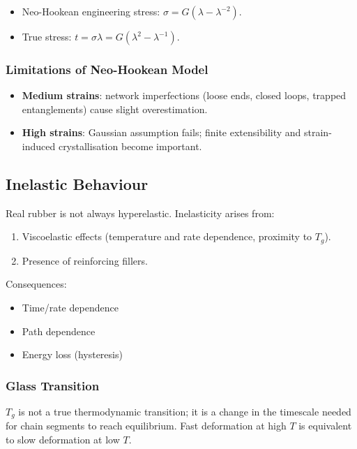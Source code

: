 \documentclass{NoteThesis/note-thesis}
\begin{document}
\begin{itemize}
    \item Neo-Hookean engineering stress: $\sigma = G(\lambda - \lambda^{-2})$.
    \item True stress: $t = \sigma\lambda = G\left(\lambda^2 - \lambda^{-1}\right)$.
\end{itemize}

\subsubsection*{Limitations of Neo-Hookean Model}

\begin{itemize}
    \item \textbf{Medium strains}: network imperfections (loose ends, closed loops, trapped entanglements) cause slight overestimation.
    \item \textbf{High strains}: Gaussian assumption fails; finite extensibility and strain-induced crystallisation become important.
\end{itemize}

\subsection{Inelastic Behaviour}

Real rubber is not always hyperelastic. Inelasticity arises from:

\begin{enumerate}
    \item Viscoelastic effects (temperature and rate dependence, proximity to $T_g$).
    \item Presence of reinforcing fillers.
\end{enumerate}

Consequences:

\begin{itemize}
    \item Time/rate dependence
    \item Path dependence
    \item Energy loss (hysteresis)
\end{itemize}

\subsubsection*{Glass Transition}

$T_g$ is not a true thermodynamic transition; it is a change in the timescale needed for chain segments to reach equilibrium. Fast deformation at high $T$ is equivalent to slow deformation at low $T$.
\end{document}
